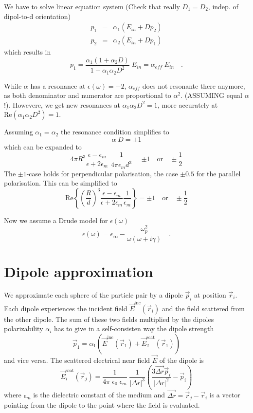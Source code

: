 We have to solve linear equation system (Check that really $D_1 = D_2$, indep. of dipol-to-d orientation)
\begin{eqnarray}
   p_1 &=&  \alpha_1 \left( E_{in}  + D p_2 \right) \\
  p_2 &=&  \alpha_2 \left( E_{in}  + D p_1 \right) 
\end{eqnarray}
which results in 
\[
  p_1=  \frac{\alpha_1 \left( 1 + \alpha_2 D \right)}{1 - \alpha_1 \alpha_2 D^2}
\; E_{in} = \alpha_{eff} \; E_{in} \quad .
\]

While $\alpha$ has a resonance at $\epsilon(\omega) = -2$, $\alpha_{eff}$ does not
resonante there anymore, as both denominator and numerator are proportional to
$\alpha^2$. (ASSUMING equal $\alpha$ !). Howevere, we get new resonances at  
$\alpha_1 \alpha_2 D^2 = 1$, more accurately at  $\text{Re}(\alpha_1 \alpha_2
D^2) = 1$. 

Assuming $\alpha_1 = \alpha_2$ the resonance condition simplifies to 
\[
  \alpha \; D = \pm 1
\]
which can be expanded to
\[
  4 \pi R^3  \frac{\epsilon - \epsilon_m}{\epsilon + 2 \epsilon_m}  \; \frac{1}{4 \pi \epsilon_m
d^3} = \pm 1 \quad \text{or} \quad \pm \frac{1}{2}
\]
The $\pm 1$-case holds for perpendicular polarisation, the case $\pm 0.5$ for
the parallel polarisation. 
This can be simplified to 
\[
\text{Re}\left\{  \left(\frac{R}{d}\right)^3  \frac{\epsilon - \epsilon_m}{\epsilon + 2 \epsilon_m} \frac{1}{\epsilon_m} \right\} = \pm 1
\quad \text{or} \quad \pm \frac{1}{2}
\]


Now we  assume a Drude model for $\epsilon(\omega)$
\[
 \epsilon(\omega) = \epsilon_{\infty} - \frac{\omega_p^2}{\omega (\omega + i \gamma)}
\quad .
\]




\section{Dipole approximation}

We approximate each sphere of the particle pair by a dipole $\vec{p}_i$ at
position $\vec{r}_i$. Each dipole experiences the incident field
$\vec{E}^{\text{inc}}(\vec{r}_i)$ and the field scattered from the other dipole.
The sum of these two fields multiplied by the dipoles polarizability $\alpha_i$
has to give in a self-consisten way the dipole strength
\begin{equation} \label{eq:fields}
     \vec{p}_1 = \alpha_1 \left(  \vec{E}^{\text{inc}}(\vec{r}_1) +
\vec{E}^{\text{scat}}_2(\vec{r}_1) \right)
\end{equation}
and vice versa. The scattered electrical near field $\vec{E}$ of the dipole is
\begin{equation}
  \vec{E}^{\text{scat}}_i(\vec{r}_j) = \frac{1}{4 \pi \;  \epsilon_0 \;
\epsilon_m} \; \frac{1}{\left| \Delta r \right|^3} 
          \left( \frac{3 \vec{\Delta r} \vec{p}_i}{{\left| \Delta r \right|^2}} 
- \vec{p}_i \right)
\end{equation}
where $\epsilon_m$ is the dielectric constant of the medium and $\vec{\Delta r}
= \vec{r}_j - \vec{r}_i$ is a vector pointing from the dipole to the point where
the field is evaluated.

